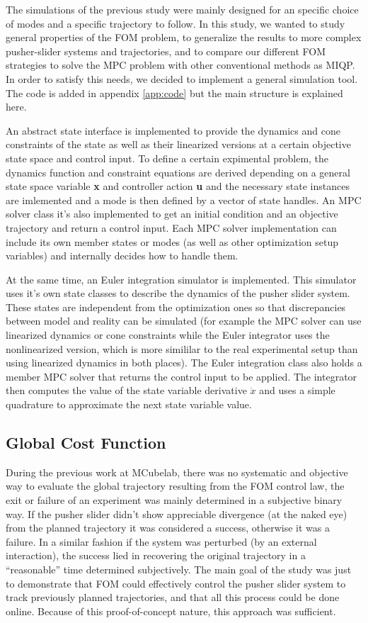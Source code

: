 \documentclass[12,twoside]{TFG-GM}
\theoremstyle{definition}
\theoremstyle{remark}
\begin{document}
The simulations of the previous study were mainly designed for an specific choice of modes and a specific trajectory to follow. In this study, we wanted to study general properties of the FOM problem, to generalize the results to more complex pusher-slider systems and trajectories, and to compare our different FOM strategies to solve the MPC problem with other conventional methods as MIQP. In order to satisfy this needs, we decided to implement a general simulation tool. The code is added in appendix \ref{app:code} but the main structure is explained here.

An abstract state interface is implemented to provide the dynamics and cone constraints of the state as well as their linearized versions at a certain objective state space and control input. To define a certain expimental problem, the dynamics function and constraint equations are derived depending on a general state space variable \textbf{x} and controller action \textbf{u} and the necessary state instances are imlemented and a mode is then defined by a vector of state handles. An MPC solver class it's also implemented to get an initial condition and an objective trajectory and return a control input. Each MPC solver implementation can include its own member states or modes (as well as other optimization setup variables) and internally decides how to handle them.

At the same time, an Euler integration simulator is implemented. This simulator uses it's own state classes to describe the dynamics of the pusher slider system. These states are independent from the optimization ones so that discrepancies between model and reality can be simulated (for example the MPC solver can use linearized dynamics or cone constraints while the Euler integrator uses the nonlinearized version, which is more simililar to the real experimental setup than using linearized dynamics in both places). The Euler integration class also holds a member MPC solver that returns the control input to be applied. The integrator then computes the value of the state variable derivative $\dot{x}$ and uses a simple quadrature to approximate the next state variable value.

\subsection{Global Cost Function}
\label{subsec:costfunc}
During the previous work at MCubelab, there was no systematic and objective way to evaluate the global trajectory resulting from the FOM control law, the exit or failure of an experiment was mainly determined in a subjective binary way. If the pusher slider didn’t show appreciable divergence (at the naked eye) from the planned trajectory it was considered a success, otherwise it was a failure. In a similar fashion if the system was perturbed (by an external interaction), the success lied in recovering the original trajectory in a “reasonable” time determined subjectively. The main goal of the study was just to demonstrate that FOM could effectively control the pusher slider system to track previously planned trajectories, and that all this process could be done online. Because of this proof-of-concept nature, this approach was sufficient.
\end{document}
